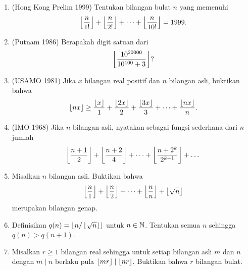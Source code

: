 \documentclass[12pt]{scrartcl}
\providecommand{\sumber}[1]{(#1)}
\begin{document}
\begin{enumerate}[resume]

	\item \sumber{Hong Kong Prelim 1999}
	Tentukan bilangan bulat $n$ yang memenuhi
	\[ \left\lfloor \frac{n}{1!} \right\rfloor + \left\lfloor \frac{n}{2!} \right\rfloor
	+ \dots + \left\lfloor \frac{n}{10!} \right\rfloor = 1999. \]

	\item \sumber{Putnam 1986}
	Berapakah digit satuan dari
	\[ \left\lfloor \frac{10^{20000}}{10^{100} + 3} \right\rfloor ? \]

	\item \sumber{USAMO 1981}
	Jika $x$ bilangan real positif dan $n$ bilangan asli, buktikan bahwa
	\[ \left\lfloor nx \right\rfloor \ge \frac{\left\lfloor x \right\rfloor}{1} + \frac{\left\lfloor 2x \right\rfloor}{2}
	+ \frac{\left\lfloor 3x \right\rfloor}{3} + \dots + \frac{\left\lfloor nx \right\rfloor}{n}. \]

	\item \sumber{IMO 1968}
	Jika $n$ bilangan asli, nyatakan sebagai fungsi sederhana dari $n$ jumlah
	\[ \left\lfloor \frac{n+1}{2} \right\rfloor + \left\lfloor \frac{n+2}{4} \right\rfloor
	+ \dots + \left\lfloor \frac{n+2^k}{2^{k+1}} \right\rfloor + \dots \]

	\item
	Misalkan $n$ bilangan asli. Buktikan bahwa
	\[ \left\lfloor \frac{n}{1} \right\rfloor + \left\lfloor \frac{n}{2} \right\rfloor + \dots
	+ \left\lfloor \frac{n}{n} \right\rfloor + \left\lfloor \sqrt{n} \right\rfloor \]
	merupakan bilangan genap.

	\item
	Definisikan $q(n) = \left\lfloor n/\left\lfloor \sqrt{n} \right\rfloor \right\rfloor$ untuk $n \in \mathbb N$.
	Tentukan semua $n$ sehingga $q(n) > q(n+1)$.

	\item
	Misalkan $r \ge 1$ bilangan real sehingga untuk setiap bilangan asli
	$m$ dan $n$ dengan $m \mid n$ berlaku pula
	$\left\lfloor mr \right\rfloor \mid \left\lfloor nr \right\rfloor$.
	Buktikan bahwa $r$ bilangan bulat.

\end{enumerate}
\end{document}
